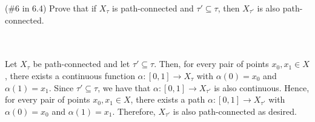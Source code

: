(\#6 in 6.4) Prove that if $X_{\tau}$ is path-connected and $\tau' \subseteq \tau$, then $X_{\tau'}$ is
also path-connected.\\\\

\begin{solution}\renewcommand{\qedsymbol}{}\ \\
    Let $X_{\tau}$ be path-connected and let $\tau'\subseteq\tau$. Then, for every pair of points
    $x_0,x_1\in X$, there exists a continuous function $\alpha:[0,1]\rightarrow X_{\tau}$ with
    $\alpha(0)=x_0$ and $\alpha(1)=x_1$. Since $\tau'\subseteq\tau$, we have that
    $\alpha:[0,1]\rightarrow X_{\tau'}$ is also continuous. Hence, for every pair of points
    $x_0,x_1\in X$, there exists a path $\alpha:[0,1]\rightarrow X_{\tau'}$ with $\alpha(0)=x_0$ and
    $\alpha(1)=x_1$. Therefore, $X_{\tau'}$ is also path-connected as desired.

\end{solution}